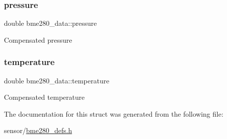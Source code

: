 \subsubsection{\texorpdfstring{pressure}{pressure}}
{\footnotesize\ttfamily double bme280\+\_\+data\+::pressure}

Compensated pressure \mbox{\label{structbme280__data_a16a033ae72f60312e8528dde5a686154}} 
\subsubsection{\texorpdfstring{temperature}{temperature}}
{\footnotesize\ttfamily double bme280\+\_\+data\+::temperature}

Compensated temperature 

The documentation for this struct was generated from the following file\+:\begin{DoxyCompactItemize}
\item 
sensor/\hyperlink{bme280__defs_8h}{bme280\+\_\+defs.\+h}\end{DoxyCompactItemize}
